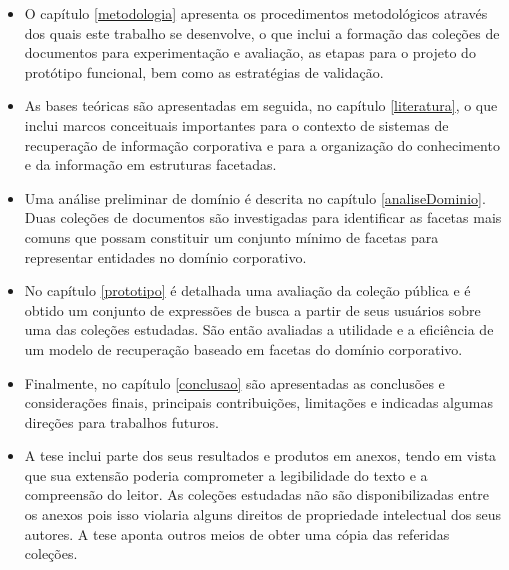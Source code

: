 \begin{itemize}


	\item O capítulo \ref{metodologia} apresenta os procedimentos metodológicos através dos quais este trabalho se desenvolve, o que inclui a formação das coleções de documentos para experimentação e avaliação, as etapas para o projeto do protótipo funcional, bem como as estratégias de validação.

	\item As bases teóricas são apresentadas em seguida, no capítulo \ref{literatura}, o que inclui marcos conceituais importantes para o contexto de sistemas de recuperação de informação corporativa e para a organização do conhecimento e da informação em estruturas facetadas.

	\item Uma análise preliminar de domínio é descrita no capítulo \ref{analiseDominio}. Duas coleções de documentos são investigadas para identificar as facetas mais comuns que possam constituir um conjunto mínimo de facetas para representar entidades no domínio corporativo.

	\item No capítulo \ref{prototipo} é detalhada uma avaliação da coleção pública e é obtido um conjunto de expressões de busca a partir de seus usuários sobre uma das coleções estudadas. São então avaliadas a utilidade e a eficiência de um modelo de recuperação baseado em facetas do domínio corporativo.

	\item Finalmente, no capítulo \ref{conclusao} são apresentadas as conclusões e considerações finais, principais contribuições, limitações e indicadas algumas direções para trabalhos futuros.

	\item A tese inclui parte dos seus resultados e produtos em anexos, tendo em vista que sua extensão poderia comprometer a legibilidade do texto e a compreensão do leitor. As coleções estudadas não são disponibilizadas entre os anexos pois isso violaria alguns direitos de propriedade intelectual dos seus autores. A tese aponta outros meios de obter uma cópia das referidas coleções.
	
\end{itemize}

